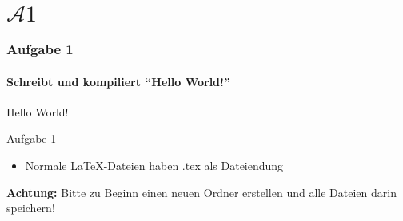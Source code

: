 \section{$\mathcal{A}1$} 
\begin{frame}
\frametitle{Aufgabe 1}
\framesubtitle{Schreibt und kompiliert ``Hello World!''}
\begin{center}
\begin{rm}
\Large Hello World!\\
\end{rm}
\end{center}
\bigskip
\bigskip
\bigskip
\begin{block}{Aufgabe 1}
\begin{itemize}
\item Normale \LaTeX -Dateien haben {\ttfamily .tex} als Dateiendung
\end{itemize}
\end{block}
\begin{alertblock}{\textbf{Achtung:}}
Bitte zu Beginn einen neuen Ordner erstellen und alle Dateien darin speichern!
\end{alertblock}
\end{frame}